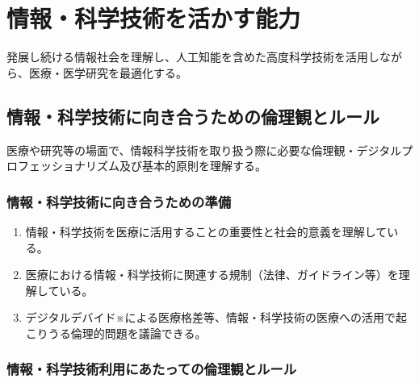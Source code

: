 \newpage

\hypertarget{ux60c5ux5831ux79d1ux5b66ux6280ux8853ux3092ux6d3bux304bux3059ux80fdux529b}{%
\section{情報・科学技術を活かす能力}\label{ux60c5ux5831ux79d1ux5b66ux6280ux8853ux3092ux6d3bux304bux3059ux80fdux529b}}

発展し続ける情報社会を理解し、人工知能を含めた高度科学技術を活用しながら、医療・医学研究を最適化する。

\hypertarget{ux60c5ux5831ux79d1ux5b66ux6280ux8853ux306bux5411ux304dux5408ux3046ux305fux3081ux306eux502bux7406ux89b3ux3068ux30ebux30fcux30eb}{%
\subsection{情報・科学技術に向き合うための倫理観とルール}\label{ux60c5ux5831ux79d1ux5b66ux6280ux8853ux306bux5411ux304dux5408ux3046ux305fux3081ux306eux502bux7406ux89b3ux3068ux30ebux30fcux30eb}}

医療や研究等の場面で、情報科学技術を取り扱う際に必要な倫理観・デジタルプロフェッショナリズム及び基本的原則を理解する。

\hypertarget{ux60c5ux5831ux79d1ux5b66ux6280ux8853ux306bux5411ux304dux5408ux3046ux305fux3081ux306eux6e96ux5099}{%
\subsubsection{情報・科学技術に向き合うための準備}\label{ux60c5ux5831ux79d1ux5b66ux6280ux8853ux306bux5411ux304dux5408ux3046ux305fux3081ux306eux6e96ux5099}}

\begin{enumerate}
\def\labelenumi{\arabic{enumi}.}
\tightlist
\item
  情報・科学技術を医療に活用することの重要性と社会的意義を理解している。
\item
  医療における情報・科学技術に関連する規制（法律、ガイドライン等）を理解している。
\item
  デジタルデバイド※による医療格差等、情報・科学技術の医療への活用で起こりうる倫理的問題を議論できる。
\end{enumerate}

\hypertarget{ux60c5ux5831ux79d1ux5b66ux6280ux8853ux5229ux7528ux306bux3042ux305fux3063ux3066ux306eux502bux7406ux89b3ux3068ux30ebux30fcux30eb}{%
\subsubsection{情報・科学技術利用にあたっての倫理観とルール}\label{ux60c5ux5831ux79d1ux5b66ux6280ux8853ux5229ux7528ux306bux3042ux305fux3063ux3066ux306eux502bux7406ux89b3ux3068ux30ebux30fcux30eb}}

